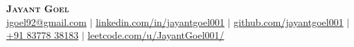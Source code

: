 \documentclass[letterpaper,13pt]{article}
\begin{document}
\begin{center}
    \textbf{\Huge \scshape Jayant Goel}%
    \hspace{0.6em}%
    \href{https://jayantgoel001.github.io}{\raisebox{0.05em}{\large{\faExternalLink}}} \\[.1in]%
    {\scriptsize
    \href{mailto:jgoel92@gmail.com}{{\faEnvelope} jgoel92@gmail.com} $|$ 
    \href{https://www.linkedin.com/in/jayantgoel001}{{\faLinkedinSquare} linkedin.com/in/jayantgoel001} $|$ 
    \href{https://github.com/jayantgoel001}{{\faGithub} github.com/jayantgoel001} $|$ 
    \href{tel:+91-8377838183}{{\faPhone} +91 83778 38183} $|$ 
    \href{https://leetcode.com/u/JayantGoel001/}{{\faCode} leetcode.com/u/JayantGoel001/}
    }
\end{center}

\end{document}
